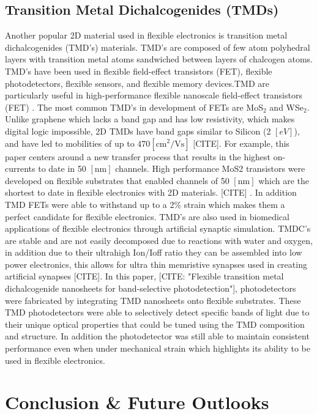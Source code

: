 \documentclass[conference]{IEEEtran}
\begin{document}
\subsection{Transition Metal Dichalcogenides (TMDs)}

Another popular 2D material used in flexible electronics is transition metal dichalcogenides (TMD’s) materials. TMD’s are composed of few atom polyhedral layers with transition metal atoms sandwiched between layers of chalcogen atoms. TMD’s have been used in flexible field-effect transistors (FET), flexible photodetectors, flexible sensors, and flexible memory devices.TMD are particularly useful  in  high-performance flexible nanoscale field-effect transistors (FET) .  The most common TMD’s in development of FETs  are  MoS$_2$ and WSe$_2 $. Unlike graphene which lacks a band gap and has low resistivity, which makes digital logic impossible, 2D TMDs have band gaps similar to Silicon (2 $[\si{eV}]$), and have led to mobilities of up to $470[\si{\centi\meter\squared\per\volt\second}]$ [CITE]. For example, this paper centers around a new transfer process that results in the highest on-currents to date in 50 $[\si{\nano\meter}]$ channels. High performance MoS2 transistors were developed on flexible substrates that enabled channels of 50 $[\si{\nano\meter}]$ which are the shortest to date in flexible electronics with 2D materials. [CITE] . In addition TMD FETs were able to withstand up to a 2\% strain which makes them a perfect candidate for flexible electronics. TMD’s are also used in biomedical applications of flexible electronics through artificial synaptic simulation. TMDC’s are stable and are not easily decomposed due to reactions with water and oxygen, in addition due to their ultrahigh Ion/Ioff ratio they can be assembled into low power electronics, this allows for ultra thin memristive synapses used in creating artificial synapses [CITE]. In this paper, [CITE: "Flexible transition metal dichalcogenide nanosheets for band-selective photodetection"], photodetectors were fabricated by integrating TMD nanosheets onto flexible substrates. These TMD photodetectors were able to selectively detect specific bands of light due to their unique optical properties that could be tuned using the TMD composition and structure. In addition the photodetector was still able to maintain consistent performance even when under mechanical strain which highlights its ability to be used in flexible electronics.

\section{Conclusion \& Future Outlooks}
\end{document}
